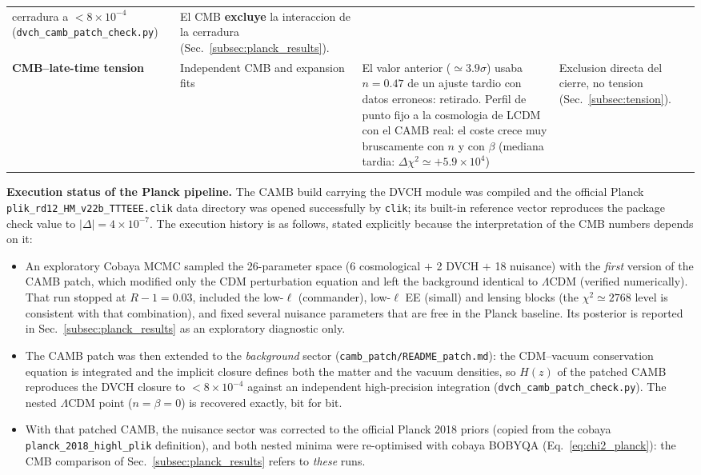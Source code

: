 \documentclass[pdflatex,sn-mathphys-num]{sn-jnl}%
\begin{document}
\begin{table}[t]
\begin{tabular}{p{}p{}p{}p{}}
cerradura a $<8\times10^{-4}$ (\texttt{dvch\_camb\_patch\_check.py}) &
El CMB \textbf{excluye} la interaccion de la cerradura
(Sec.~\ref{subsec:planck_results}). \\
\textbf{CMB--late-time tension} & Independent CMB and expansion fits &
El valor anterior ($\simeq3.9\sigma$) usaba $n=0.47$ de un ajuste tardio
con datos erroneos: retirado. Perfil de punto fijo a la cosmologia de
LCDM con el CAMB real: el coste crece muy bruscamente con $n$ y con
$\beta$ (mediana tardia: $\Delta\chi^2\simeq+5.9\times10^4$) &
Exclusion directa del cierre, no tension (Sec.~\ref{subsec:tension}). \\
\bottomrule
\end{tabular}
\end{table}

\noindent\textbf{Execution status of the Planck pipeline.}
The CAMB build carrying the DVCH module was compiled and the official Planck
\texttt{plik\_rd12\_HM\_v22b\_TTTEEE.clik} data directory was
opened successfully by \texttt{clik}; its built-in reference vector reproduces
the package check value to $|\Delta|=4\times10^{-7}$. The execution history
is as follows, stated explicitly because the interpretation of the CMB
numbers depends on it:
\begin{itemize}
    \item An exploratory Cobaya MCMC sampled the 26-parameter space
    (6 cosmological $+$ 2 DVCH $+$ 18 nuisance) with the \emph{first}
    version of the CAMB patch, which modified only the CDM perturbation
    equation and left the background identical to $\Lambda$CDM
    (verified numerically). That run stopped at $R-1=0.03$, included
    the low-$\ell$ (commander), low-$\ell$ EE (simall) and lensing
    blocks (the $\chi^2\simeq2768$ level is consistent with that
    combination), and fixed several nuisance parameters that are free
    in the Planck baseline. Its posterior is reported in
    Sec.~\ref{subsec:planck_results} as an exploratory diagnostic only.
    \item The CAMB patch was then extended to the \emph{background}
    sector (\texttt{camb\_patch/README\_patch.md}): the CDM--vacuum
    conservation equation is integrated and the implicit closure
    defines both the matter and the vacuum densities, so $H(z)$ of the
    patched CAMB reproduces the DVCH closure to $<8\times10^{-4}$
    against an independent high-precision integration
    (\texttt{dvch\_camb\_patch\_check.py}). The nested $\Lambda$CDM
    point ($n=\beta=0$) is recovered exactly, bit for bit.
    \item With that patched CAMB, the nuisance sector was corrected to
    the official Planck 2018 priors (copied from the cobaya
    \texttt{planck\_2018\_highl\_plik} definition), and both nested
    minima were re-optimised with cobaya BOBYQA
    (Eq.~\ref{eq:chi2_planck}): the CMB comparison of
    Sec.~\ref{subsec:planck_results} refers to \emph{these} runs.
\end{itemize}
\end{document}
